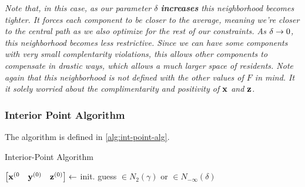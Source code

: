 \textit{Note that, in this case, as our parameter $\delta$ \textbf{increases} this 
neighborhood becomes tighter. It forces each component to be \textit{closer}
to the average, meaning we're closer to the central path as we also optimize
for the rest of our constraints. As $\delta \rightarrow 0$, this neighborhood 
becomes less restrictive. Since we can have some 
components with very small complentarity violations, this allows other 
components to compensate in drastic ways, which allows a much larger space 
of residents. Note again that this neighborhood is not defined with the other
values of $F$ in mind. It it solely worried about the complimentarity and 
positivity of $\mathbf{x}$ and $\mathbf{z}$.}

\subsubsection{Interior Point Algorithm}

The algorithm is defined in \ref{alg:int-point-alg}.

\begin{algorithm}\label{alg:int-point-alg}
\caption{Interior-Point Algorithm}
	\KwOut{$\vx^*, \vy^*, \vz^*$}
	$\begin{bmatrix} \mathbf{x}^{(0} & \mathbf{y}^{(0)} & \mathbf{z}^{(0)} \end{bmatrix} \leftarrow $ init. guess $\in N_2(\gamma)$ or $\in N_{-\infty}(\delta)$\;
\end{algorithm}


